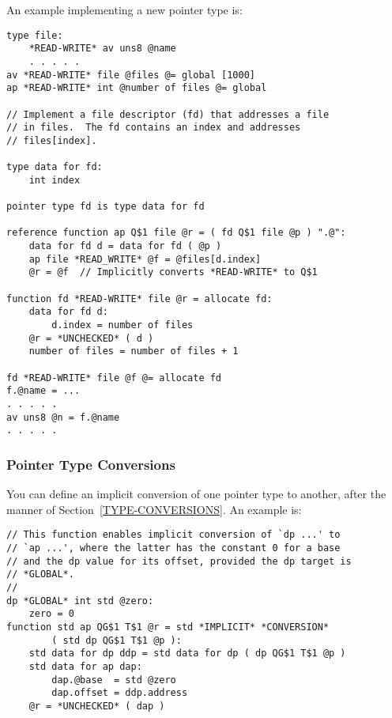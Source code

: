 \documentclass[12pt]{article}
\newenvironment{indpar}[1][0.3in]%
	{\begin{list}{}%
		     {\setlength{\itemsep}{0in}%
		      \setlength{\topsep}{0in}%
		      \setlength{\parsep}{1ex}%
		      \setlength{\labelwidth}{#1}%
		      \setlength{\leftmargin}{#1}%
		      \addtolength{\leftmargin}{\labelsep}}%
	 \item}%
	{\end{list}}
\begin{document}
An example implementing a new pointer type is:

\begin{indpar}\begin{verbatim}
type file:
    *READ-WRITE* av uns8 @name
    . . . . .
av *READ-WRITE* file @files @= global [1000]
ap *READ-WRITE* int @number of files @= global

// Implement a file descriptor (fd) that addresses a file
// in files.  The fd contains an index and addresses
// files[index].

type data for fd:
    int index

pointer type fd is type data for fd

reference function ap Q$1 file @r = ( fd Q$1 file @p ) ".@":
    data for fd d = data for fd ( @p )
    ap file *READ_WRITE* @f = @files[d.index]
    @r = @f  // Implicitly converts *READ-WRITE* to Q$1

function fd *READ-WRITE* file @r = allocate fd:
    data for fd d:
        d.index = number of files
    @r = *UNCHECKED* ( d )
    number of files = number of files + 1

fd *READ-WRITE* file @f @= allocate fd
f.@name = ...
. . . . .
av uns8 @n = f.@name
. . . . .
\end{verbatim}\end{indpar}

\subsubsection{Pointer Type Conversions}
\label{POINTER-TYPE-CONVERSIONS}

You can define an implicit conversion of one pointer type
to another, after the manner of Section~\ref{TYPE-CONVERSIONS}.
An example is:

\begin{indpar}\begin{verbatim}
// This function enables implicit conversion of `dp ...' to
// `ap ...', where the latter has the constant 0 for a base
// and the dp value for its offset, provided the dp target is
// *GLOBAL*.
// 
dp *GLOBAL* int std @zero:
    zero = 0
function std ap QG$1 T$1 @r = std *IMPLICIT* *CONVERSION*
        ( std dp QG$1 T$1 @p ):
    std data for dp ddp = std data for dp ( dp QG$1 T$1 @p )
    std data for ap dap:
        dap.@base  = std @zero
        dap.offset = ddp.address
    @r = *UNCHECKED* ( dap )
\end{verbatim}\end{indpar}
\end{document}
